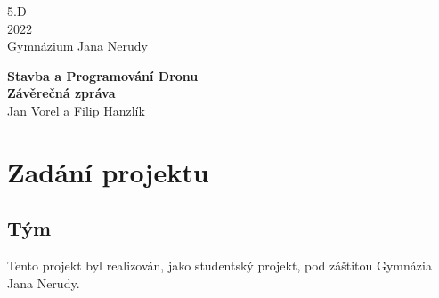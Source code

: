 \documentclass[12pt]{report}
\begin{document}
\begin{titlepage}
	\begin{flushright}
	5.D \\
	2022 \\
	Gymnázium Jana Nerudy
	\end{flushright}
	\vspace*{6cm}
	
	\begin{center}
		\textbf{\huge Stavba a Programování Dronu} \\
		\textbf{\huge Závěrečná zpráva } \\[\baselineskip]
		{\LARGE Jan Vorel a Filip Hanzlík}
	\end{center}		
\end{titlepage}


\tableofcontents

\chapter{Zadání projektu}
\section{Tým}
Tento projekt byl realizován, jako studentský projekt, pod záštitou Gymnázia Jana Nerudy.
\end{document}
